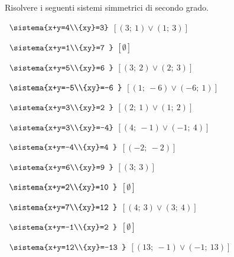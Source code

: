 \begin{esercizio}[*]
 \label{ese:6.14}
Risolvere i seguenti sistemi simmetrici di secondo grado.
\begin{htmulticols}{2}
 \begin{enumeratea}
 \item~\(\sistema{x+y=4\\{xy}=3}\)
  \hfill\(\left[(3;~1)\vee(1;~3)\right]\)
 \item~\(\sistema{x+y=1\\{xy}=7 }\)
  \hfill\(\left[\emptyset\right]\)
 \item~\(\sistema{x+y=5\\{xy}=6 }\)
  \hfill\(\left[(3;~2)\vee(2;~3)\right]\)
 \item~\(\sistema{x+y=-5\\{xy}=-6 }\)
  \hfill\(\left[(1;~-6)\vee(-6;~1)\right]\)
 \item~\(\sistema{x+y=3\\{xy}=2 }\)
  \hfill\(\left[(2;~1)\vee(1;~2)\right]\)
 \item~\(\sistema{x+y=3\\{xy}=-4}\)
  \hfill\(\left[(4;~-1)\vee(-1;~4)\right]\)
 \item~\(\sistema{x+y=-4\\{xy}=4 }\)
  \hfill\(\left[(-2;~-2)\right]\)
 \item~\(\sistema{x+y=6\\{xy}=9 }\)
  \hfill\(\left[(3;~3)\right]\)
 \item~\(\sistema{x+y=2\\{xy}=10 }\)
  \hfill\(\left[\emptyset\right]\)
 \item~\(\sistema{x+y=7\\{xy}=12 }\)
  \hfill\(\left[(4;~3)\vee(3;~4)\right]\)
 \item~\(\sistema{x+y=-1\\{xy}=2 }\)
  \hfill\(\left[\emptyset\right]\)
 \item~\(\sistema{x+y=12\\{xy}=-13 }\)
  \hfill\(\left[(13;~-1)\vee(-1;~13)\right]\)

\end{enumeratea}
\end{htmulticols}
\end{esercizio}
